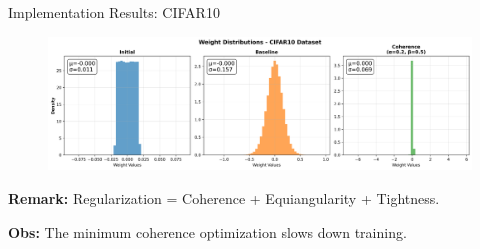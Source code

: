 \documentclass[9pt,dvipsnames]{beamer}
\begin{document}
\begin{frame}{Implementation Results: CIFAR10}
    \begin{figure}[H]
        \centering
        \includegraphics[width=\textwidth]{../plots/mlp/cifar10/hs128_ep50/weights_distribution_baseline.png}
    \end{figure}

	\textbf{Remark:} Regularization = Coherence + Equiangularity + Tightness.

	\textbf{Obs:} The minimum coherence optimization slows down training.
\end{frame}
\end{document}
